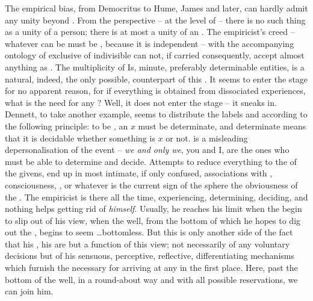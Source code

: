 The empirical bias, from Democritus to Hume, James and later, can hardly admit
any unity beyond .  From the 
perspective -- at the level of  -- there is no such thing as a
unity of a person; there is at most a unity of an .  The empiricist's
creed -- whatever can be  must be , because it
is independent -- with the accompanying {ontology} of exclusive  of
indivisible  can not, if carried consequently, accept almost anything
as .  The multiplicity of Is, minute, preferably determinable
entities, is a natural, indeed, the only possible, counterpart of this
.  It seems to enter the stage for no apparent reason, for if
everything is obtained from dissociated experiences, what is the need for any
?  Well, it does not enter the stage -- it sneaks in.  Dennett, to take
another example, seems to distribute the labels  and 
according to the following principle: to be , an $x$ must be
determinate, and determinate means that it is decidable whether something is $x$
or not.  is a misleading depersonalisation
of the event -- {\em we and only we}, you and I, are the ones who must be able
to determine and decide.
Attempts to reduce everything to the  of the givens, end
up in most intimate, if only confused, associations with ,
consciousness, , or whatever is the current sign of the sphere
 the obviousness of the .  The empiricist is
there all the time, experiencing, determining, deciding, and nothing helps
getting rid of {\em himself}.  Usually, he reaches his limit when the
 begin to slip out of his view, when the well, from the bottom of
which he hopes to dig out the , begins to seem \ldots bottomless.
But this is only another side of the fact that his , his
 are but a function of this view; not necessarily of any voluntary
decisions but of his sensuous, perceptive, reflective, differentiating
mechanisms which furnish the  necessary for arriving at any
 in the first place.  Here, past the bottom of the well, in a
round-about way and with all possible reservations, we can join him.

